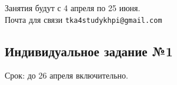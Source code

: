 




\Russian

\begin{flushright}
Занятия будут с 4 апреля по 25 июня. \\
Почта для связи \texttt{tka4studykhpi@gmail.com}
\end{flushright}

\subsection*{Индивидуальное задание №1}
Срок: до 26 апреля включительно.

